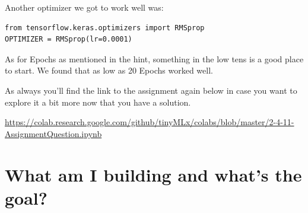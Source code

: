 Another optimizer we got to work well was:

\begin{lstlisting}
from tensorflow.keras.optimizers import RMSprop
OPTIMIZER = RMSprop(lr=0.0001)
\end{lstlisting}

As for Epochs as mentioned in the hint, something in the low tens is a good place to start. We found that as low as 20 Epochs worked well.

As always you’ll find the link to the assignment again below in case you want to explore it a bit more now that you have a solution.

\url{https://colab.research.google.com/github/tinyMLx/colabs/blob/master/2-4-11-AssignmentQuestion.ipynb}


\section{What am I building and what's the goal?}


